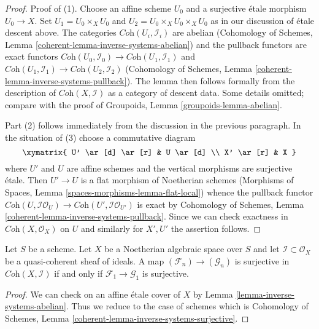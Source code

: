 \begin{proof}
Proof of (1). Choose an affine scheme $U_0$ and a surjective \'etale morphism
$U_0 \to X$. Set $U_1 = U_0 \times_X U_0$ and
$U_2 = U_0 \times_X U_0 \times_X U_0$ as in our discussion of
\'etale descent above. The categories $\textit{Coh}(U_i, \mathcal{I}_i)$
are abelian
(Cohomology of Schemes, Lemma \ref{coherent-lemma-inverse-systems-abelian})
and the pullback functors are exact functors
$\textit{Coh}(U_0, \mathcal{I}_0) \to \textit{Coh}(U_1, \mathcal{I}_1)$
and
$\textit{Coh}(U_1, \mathcal{I}_1) \to \textit{Coh}(U_2, \mathcal{I}_2)$
(Cohomology of Schemes, Lemma \ref{coherent-lemma-inverse-systems-pullback}).
The lemma then follows formally from the description of
$\textit{Coh}(X, \mathcal{I})$ as a category of descent data.
Some details omitted; compare with the proof of
Groupoids, Lemma \ref{groupoids-lemma-abelian}.

\medskip\noindent
Part (2) follows immediately from the discussion in the previous paragraph.
In the situation of (3) choose a commutative diagram
$$
\xymatrix{
U' \ar[d] \ar[r] & U \ar[d] \\
X' \ar[r] & X
}
$$
where $U'$ and $U$ are affine schemes and the vertical morphisms are
surjective \'etale. Then $U' \to U$ is a flat morphism of Noetherian
schemes (Morphisms of Spaces, Lemma \ref{spaces-morphisms-lemma-flat-local})
whence the pullback functor
$\textit{Coh}(U, \mathcal{I}\mathcal{O}_U) \to
\textit{Coh}(U', \mathcal{I}\mathcal{O}_{U'})$
is exact by
Cohomology of Schemes, Lemma \ref{coherent-lemma-inverse-systems-pullback}.
Since we can check exactness in $\textit{Coh}(X, \mathcal{O}_X)$
on $U$ and similarly for $X', U'$ the assertion follows.
\end{proof}

\begin{lemma}
\label{lemma-inverse-systems-surjective}
Let $S$ be a scheme. Let $X$ be a Noetherian algebraic space over $S$
and let $\mathcal{I} \subset \mathcal{O}_X$ be a quasi-coherent sheaf
of ideals. A map $(\mathcal{F}_n) \to (\mathcal{G}_n)$ is surjective in
$\textit{Coh}(X, \mathcal{I})$ if and only if
$\mathcal{F}_1 \to \mathcal{G}_1$ is surjective.
\end{lemma}

\begin{proof}
We can check on an affine \'etale cover of $X$ by
Lemma \ref{lemma-inverse-systems-abelian}.
Thus we reduce to the case of schemes which is
Cohomology of Schemes, Lemma \ref{coherent-lemma-inverse-systems-surjective}.
\end{proof}

